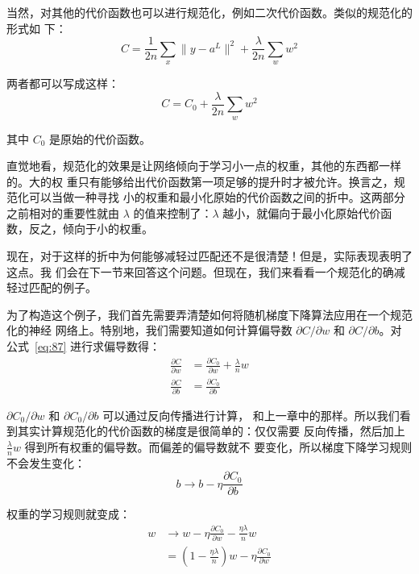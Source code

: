 当然，对其他的代价函数也可以进行规范化，例如二次代价函数。类似的规范化的形式如
下：
\begin{equation}
  C = \frac{1}{2n} \sum_x \|y-a^L\|^2 + \frac{\lambda}{2n} \sum_w w^2
  \label{eq:86}\tag{86}
\end{equation}

两者都可以写成这样：
\begin{equation}
  C = C_0 + \frac{\lambda}{2n} \sum_w w^2
  \label{eq:87}\tag{87}
\end{equation}

其中 $C_0$ 是原始的代价函数。

直觉地看，规范化的效果是让网络倾向于学习小一点的权重，其他的东西都一样的。大的权
重只有能够给出代价函数第一项足够的提升时才被允许。换言之，规范化可以当做一种寻找
小的权重和最小化原始的代价函数之间的折中。这两部分之前相对的重要性就由 $\lambda$
的值来控制了：$\lambda$ 越小，就偏向于最小化原始代价函数，反之，倾向于小的权重。

现在，对于这样的折中为何能够减轻过匹配还不是很清楚！但是，实际表现表明了这点。我
们会在下一节来回答这个问题。但现在，我们来看看一个规范化的确减轻过匹配的例子。

为了构造这个例子，我们首先需要弄清楚如何将随机梯度下降算法应用在一个规范化的神经
网络上。特别地，我们需要知道如何计算偏导数 $\partial C/\partial w$ 和
$\partial C/\partial b$。对公式~\eqref{eq:87} 进行求偏导数得：
\begin{align}
  \frac{\partial C}{\partial w} & = \frac{\partial C_0}{\partial w} +
                                  \frac{\lambda}{n} w \label{eq:88}\tag{88} \\
  \frac{\partial C}{\partial b} & = \frac{\partial C_0}{\partial b} \label{eq:89}\tag{89}
\end{align}

$\partial C_0/\partial w$ 和 $\partial C_0/\partial b$ 可以通过反向传播进行计算，
和上一章中的那样。所以我们看到其实计算规范化的代价函数的梯度是很简单的：仅仅需要
反向传播，然后加上 $\frac{\lambda}{n} w$ 得到所有权重的偏导数。而偏差的偏导数就不
要变化，所以梯度下降学习规则不会发生变化：
\begin{equation}
  b \rightarrow b -\eta \frac{\partial C_0}{\partial b}
  \label{eq:90}\tag{90}
\end{equation}

权重的学习规则就变成：
\begin{align}
  w & \rightarrow w-\eta \frac{\partial C_0}{\partial
      w}-\frac{\eta \lambda}{n} w \label{eq:91}\tag{91}\\
    & = \left(1-\frac{\eta \lambda}{n}\right) w -\eta \frac{\partial
      C_0}{\partial w} \label{eq:92}\tag{92}
\end{align}

